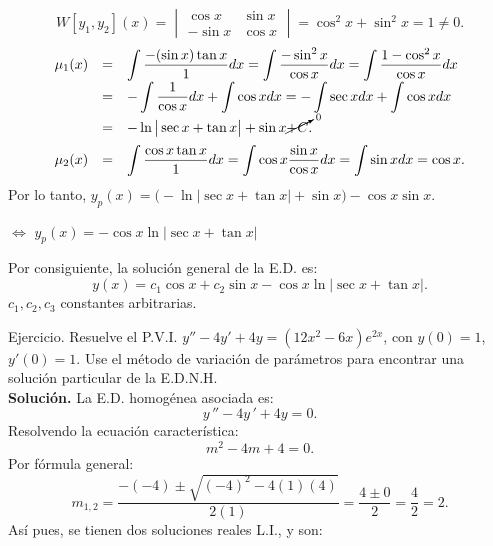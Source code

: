 \documentclass[9pt]{beamer}
\begin{document}
\begin{frame}[t]
	\vspace{-4mm}
	\begin{exampleblock}{}
		\[
			W[y_1,y_2] (x) = \begin{vmatrix}
				\cos x & \sin x \\
				- \sin x & \cos x
			\end{vmatrix} = \cos ^2x + \sin ^2x = 1 \ne 0.
		\]
		\[
			\begin{array}{rcl}
				\mu _1(x) & = & \displaystyle\int \dfrac{-( \sin x) \tan x}{1} dx = \displaystyle\int \dfrac{- \sin ^2x}{\cos x} dx = \displaystyle\int \dfrac{1- \cos ^2x}{\cos x} dx \\[2mm]
				& = & - \displaystyle\int \dfrac{1}{\cos x} dx + \displaystyle\int \cos x dx = - \displaystyle\int \sec x dx + \displaystyle\int \cos x dx \\[2mm]
				& = & - \ln \big| \sec x+ \tan x \big| + \sin x \cancelto{0}{+C}. \\[2mm]
				\mu _2(x) & = & \displaystyle\int \dfrac{\cos x \tan x}{1} dx = \displaystyle\int \cos x \dfrac{\sin x}{\cos x} dx = \displaystyle\int \sin xdx = \cos x.
			\end{array}
		\]
		Por lo tanto, \(y_p(x) = \big(- \ln  \big| \sec x+ \tan x \big| + \sin x\big) - \cos x \sin x\).
		\begin{center}
			\(\iff\) \color{red} \underline{\color{black} \(y_p(x) = - \cos x \ln \big| \sec x+ \tan x \big|\)}
		\end{center}
		Por consiguiente, la solución general de la E.D. es:
		\[
			y(x) = c_1 \cos x + c_2 \sin x- \cos x \ln \big| \sec x+ \tan x \big| .
		\]
		\(c_1,c_2,c_3\) constantes arbitrarias.
	\end{exampleblock}
\end{frame}

\begin{frame}[t]
	\begin{alertblock}{Ejercicio.}
		Resuelve el P.V.I. \(y'' -4y' +4y=(12x^2-6x) e^{2x}\), con \(y(0) =1\), \(y' (0) =1\). Use el método de variación de parámetros para encontrar una solución particular de la E.D.N.H. \\[2mm]
		\textbf{Solución.} La E.D. homogénea asociada es:
		\[
			y\,'' -4y\,' +4y=0.
		\]
		Resolvendo la ecuación característica:
		\[
			m^2-4m+4 = 0.
		\]
		Por fórmula general:
		\[
			m_{1,2} = \dfrac{-(-4) \pm \sqrt{(-4) ^2-4(1) (4)}}{2(1)} = \dfrac{4 \pm 0}{2} = \dfrac{4}{2} = 2.
		\]
		Así pues, se tienen dos soluciones reales L.I., y son:
	\end{alertblock}
\end{frame}
\end{document}
